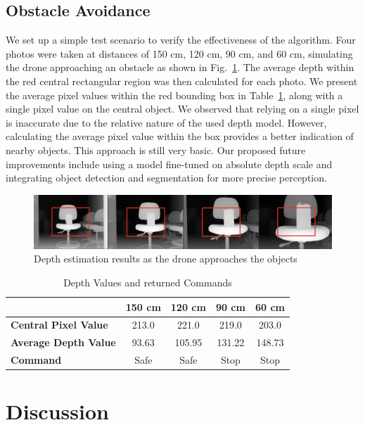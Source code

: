 \documentclass[conference]{IEEEtran}
\begin{document}
\subsection{Obstacle Avoidance}
We set up a simple test scenario to verify the effectiveness of the algorithm. Four photos were taken at distances of 150 cm, 120 cm, 90 cm, and 60 cm, simulating the drone approaching an obstacle as shown in Fig.~\ref{fig:perception}. The average depth within the red central rectangular region was then calculated for each photo. We present the average pixel values within the red bounding box in Table~\ref{tab:perception}, along with a single pixel value on the central object. We observed that relying on a single pixel is inaccurate due to the relative nature of the used depth model. However, calculating the average pixel value within the box provides a better indication of nearby objects. This approach is still very basic. Our proposed future improvements include using a model fine-tuned on absolute depth scale and integrating object detection and segmentation for more precise perception.

\begin{figure}[h]
    \centering
    \includegraphics[width=\columnwidth]{figures/perception.png}
    \caption{Depth estimation results as the drone approaches the objects}
    \label{fig:perception}
\end{figure}

\begin{table}[h]
\centering
\caption{Depth Values and returned Commands}
\label{tab:perception}
\begin{tabular}{lcccc}
\toprule
 & \textbf{150 cm} & \textbf{120 cm} & \textbf{90 cm} & \textbf{60 cm} \\ \midrule
\textbf{Central Pixel Value} & 213.0 & 221.0 & 219.0 & 203.0 \\
\textbf{Average Depth Value} & 93.63 & 105.95 & 131.22 & 148.73 \\
\textbf{Command}             & Safe  & Safe   & Stop   & Stop   \\ 
\bottomrule
\end{tabular}
\end{table}


\section{Discussion}
\end{document}
